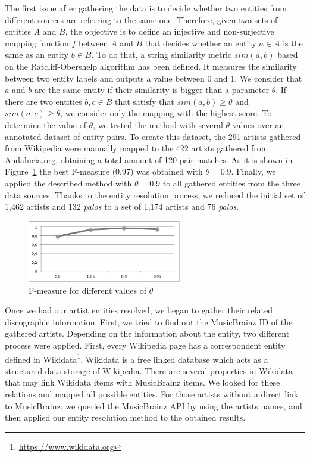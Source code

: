 The first issue after gathering the data is to decide whether two entities from different sources are referring to the same one. Therefore, given two sets of entities $A$ and $B$, the objective is to define an injective and non-surjective mapping function $f$ between $A$ and $B$ that decides whether an entity $a \in A$ is the same as an entity $b \in B$. To do that, a string similarity metric $sim(a,b)$ based on the Ratcliff-Obershelp algorithm \citep{Ratcliff1988} has been defined. It measures the similarity between two entity labels and outputs a value between 0 and 1. We consider that $a$ and $b$ are the same entity if their similarity is bigger than a parameter $\theta$. If there are two entities $b, c \in B$ that satisfy that $sim(a,b) \geq \theta$ and $sim(a,c) \geq \theta$, we consider only the mapping with the highest score. To determine the value of $\theta$, we tested the method with several $\theta$ values over an annotated dataset of entity pairs. To create this dataset, the 291 artists gathered from Wikipedia were manually mapped to the 422 artists gathered from Andalucia.org, obtaining a total amount of 120 pair matches. As it is shown in Figure~\ref{fig:musicology:fmeasure} the best F-measure (0,97) was obtained with $\theta=0.9$. Finally, we applied the described method with $\theta=0.9$ to all gathered entities from the three data sources. Thanks to the entity resolution process, we reduced the initial set of 1,462 artists and 132 \textit{palos} to a set of 1,174 artists and 76 \textit{palos}.

\begin{figure}
	\centering
	\includegraphics[width=0.60\textwidth]{ch05_musicology_pics/similarity_f_bn.png}
	\caption{F-measure for different values of $\theta$ \label{fig:musicology:fmeasure}}
\end{figure}

Once we had our artist entities resolved, we began to gather their related discographic information. First, we tried to find out the MusicBrainz ID of the gathered artists. Depending on the information about the entity, two different process were applied. First, every Wikipedia page has a correspondent entity defined in Wikidata\footnote{\url{https://www.wikidata.org}}. Wikidata is a free linked database which acts as a structured data storage of Wikipedia. There are several properties in Wikidata that may link Wikidata items with MusicBrainz items. %
We looked for these relations and mapped all possible entities. For those artists without a direct link to MusicBrainz, we queried the MusicBrainz API by using the artists names, and then applied our entity resolution method to the obtained results.

